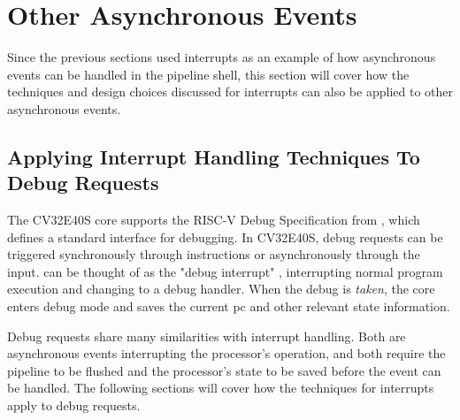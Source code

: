 %
%
%
%




\section{Other Asynchronous Events}%
\label{sec:other_async}

Since the previous sections used interrupts as an example of how asynchronous events can be handled in the pipeline shell, this section will cover how the techniques and design choices discussed for interrupts can also be applied to other asynchronous events.


\subsection{Applying Interrupt Handling Techniques To Debug Requests}

%

The CV32E40S core \cite{openhwgroupDebugTriggerCOREV2023} supports the RISC-V Debug Specification from \cite{pauldonahueRISCVDebugSupport2023}, which defines a standard interface for debugging. In CV32E40S, debug requests can be triggered synchronously through  instructions or asynchronously through the  input.  can be thought of as the "debug interrupt" \cite{openhwgroupDebugTriggerCOREV2023}, interrupting normal program execution and changing to a debug handler. When the debug is \textit{taken}, the core enters debug mode and saves the current \acrshort{pc} and other relevant state information.

Debug requests share many similarities with interrupt handling. Both are asynchronous events interrupting the processor's operation, and both require the pipeline to be flushed and the processor's state to be saved before the event can be handled. The following sections will cover how the techniques for interrupts apply to debug requests.  


